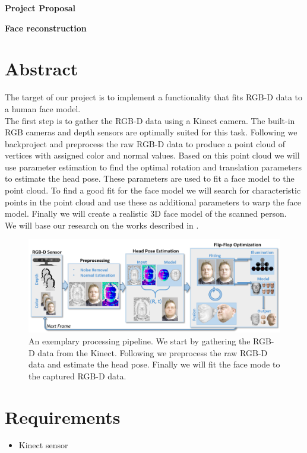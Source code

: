 \documentclass[a4paper,pagesize 10pt]{scrartcl}
\begin{document}
\begin{center}{\Huge\textbf{Project Proposal}}\end{center}
\begin{center}{\Large\textbf{Face reconstruction}}\end{center}

\section{Abstract}
The target of our project is to implement a functionality that fits RGB-D data to a human face model.\\
The first step is to gather the RGB-D data using a Kinect camera. The built-in RGB cameras and depth sensors are optimally suited for this task.
Following we backproject and preprocess the raw RGB-D data to produce a point cloud of vertices with assigned color and normal values. 
Based on this point cloud we will use parameter estimation to find the optimal rotation and translation parameters to estimate the head pose. These parameters are used to fit a face model to the point cloud.
To find a good fit for the face model we will search for characteristic points in the point cloud and use these as additional parameters to warp the face model.
Finally we will create a realistic 3D face model of the scanned person.\\
We will base our research on the works described in \cite{Bondi2015, Shin2017, Turban2015,Zhang2016,Zollhofer2014}.

\begin{figure}[h]
	\centering
	\includegraphics[width=\linewidth]{Images/pipeline.png}
	\caption{An exemplary processing pipeline. We start by gathering the RGB-D data from the Kinect. Following we preprocess the raw RGB-D data and estimate the head pose. Finally we will fit the face mode to the captured RGB-D data.}
	\label{fig:overview}
\end{figure}

\section{Requirements}
\begin{itemize}	
	\item Kinect sensor
\end{itemize}
\end{document}
